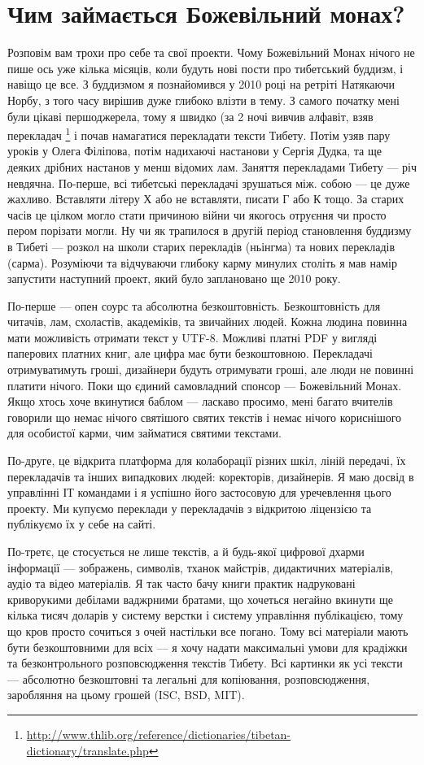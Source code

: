 \section{Чим займається Божевільний монах?}

Розповім вам трохи про себе та свої проекти.
Чому Божевільний Монах нічого не пише ось уже
кілька місяців, коли будуть нові пости про
тибетський буддизм, і навіщо це все. З
буддизмом я познайомився у 2010 році на ретріті
Натякаючи Норбу, з того часу вирішив дуже глибоко влізти в тему.
З самого початку мені були цікаві першоджерела,
тому я швидко (за 2 ночі вивчив алфавіт, взяв
перекладач \footnote{\url{http://www.thlib.org/reference/dictionaries/tibetan-dictionary/translate.php}}
і почав намагатися перекладати тексти Тибету.
Потім узяв пару уроків у Олега Філіпова, потім
надихаючі настанови у Сергія Дудка, та ще
деяких дрібних настанов у менш відомих лам.
Заняття перекладами Тибету --- річ невдячна.
По-перше, всі тибетські перекладачі зрушаться між.
собою --- це дуже жахливо. Вставляти літеру Х або
не вставляти, писати Г або К тощо.
За старих часів це цілком могло стати причиною
війни чи якогось отруєння чи просто пером
порізати могли. Ну чи як трапилося в другій
період становлення буддизму в Тибеті --- розкол
на школи старих перекладів (ньінгма) та нових
перекладів (сарма). Розуміючи та відчуваючи глибоку
карму минулих століть я мав намір запустити
наступний проект, який було заплановано ще 2010 року.

По-перше — опен соурс та абсолютна безкоштовність.
Безкоштовність для читачів, лам, схоластів, академіків,
та звичайних людей. Кожна людина повинна мати можливість
отримати текст у UTF-8. Можливі платні PDF у вигляді
паперових платних книг, але цифра має бути безкоштовною.
Перекладачі отримуватимуть гроші, дизайнери будуть
отримувати гроші, але люди не повинні платити нічого.
Поки що єдиний самовладний спонсор --- Божевільний Монах.
Якщо хтось хоче вкинутися баблом --- ласкаво просимо,
мені багато вчителів говорили що немає нічого святішого
святих текстів і немає нічого кориснішого для особистої
карми, чим займатися святими текстами.

По-друге, це відкрита платформа для колаборації різних шкіл,
ліній передачі, їх перекладачів та інших випадкових людей:
коректорів, дизайнерів. Я маю досвід в управлінні ІТ командами
і я успішно його застосовую для уречевлення цього проекту.
Ми купуємо переклади у перекладачів з відкритою ліцензією
та публікуємо їх у себе на сайті.

По-третє, це стосується не лише текстів, а й будь-якої цифрової
дхарми інформації --- зображень, символів, тханок майстрів,
дидактичних матеріалів, аудіо та відео матеріалів. Я так часто
бачу книги практик надруковані криворукими дебілами ваджрними
братами, що хочеться негайно вкинути ще кілька тисяч доларів
у систему верстки і систему управління публікацією, тому що
кров просто сочиться з очей настільки все погано. Тому всі
матеріали мають бути безкоштовними для всіх --- я хочу надати
максимальні умови для крадіжки та безконтрольного розповсюдження
текстів Тибету. Всі картинки як усі тексти --- абсолютно
безкоштовні та легальні для копіювання, розповсюдження,
заробляння на цьому грошей (ISC, BSD, MIT).

